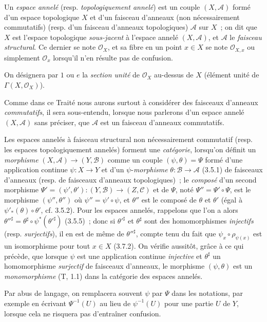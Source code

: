 \begin{env}[4.1.1]
\label{0.4.1.1-fr}
Un \emph{espace annelé} (resp. \emph{topologiquement annelé}) est un couple
$(X,\mathcal{A})$ formé d'un espace topologique $X$ et d'un faisceau d'anneaux
(non nécessairement commutatifs) (resp. d'un faisceau d'anneaux topologiques)
$\mathcal{A}$ sur $X$~; on dit que $X$ est l'espace
topologique \emph{sous-jacent} à l'espace annelé $(X,\mathcal{A})$, et
$\mathcal{A}$ le \emph{faisceau structural}. Ce dernier se note
$\mathcal{O}_X$, et sa fibre en un point $x\in X$ se note $\mathcal{O}_{X,x}$
ou simplement $\mathcal{O}_x$ lorsqu'il n'en résulte pas de confusion.

On désignera par $1$ ou $e$ la \emph{section unité} de $\mathcal{O}_X$
au-dessus de $X$ (élément unité de $\Gamma(X,\mathcal{O}_X)$).

Comme dans ce Traité nous aurons surtout à considérer des faisceaux d'anneaux
\emph{commutatifs}, il sera sous-entendu, lorsque nous parlerons d'un espace
annelé $(X,\mathcal{A})$ sans préciser, que $\mathcal{A}$ est un faisceau
d'anneaux commutatifs.

Les espaces annelés à faisceau structural non nécessairement commutatif
(resp. les espaces topologiquement annelés) forment une \emph{catégorie},
lorsqu'on définit un \emph{morphisme}
$(X,\mathcal{A})\to(Y,\mathcal{B})$ comme un couple
$(\psi,\theta)=\Psi$ formé d'une application continue $\psi:X\to Y$ et d'un
$\psi$-\emph{morphisme} $\theta:\mathcal{B}\to\mathcal{A}$ (3.5.1) de
faisceaux d'anneaux (resp. de faisceaux d'anneaux topologiques)~; le
\emph{composé} d'un second morphisme
$\Psi'=(\psi',\theta'):(Y,\mathcal{B})\to(Z,\mathcal{C})$ et de $\Psi$, noté
$\Psi''=\Psi'\circ\Psi$, est le morphisme $(\psi'',\theta'')$ où
$\psi''=\psi'\circ\psi$, et $\theta''$ est le composé de $\theta$ et $\theta'$
(égal à $\psi'_*(\theta)\circ\theta'$, cf. 3.5.2). Pour les espaces
annelés, rappelons que l'on a alors
$\theta''^\sharp=\theta^\sharp\circ\psi^*(\theta'^\sharp)$ (3.5.5)~; donc si
$\theta'^\sharp$ et $\theta^\sharp$ sont des homomorphismes \emph{injectifs}
(resp. \emph{surjectifs}), il en est de même de $\theta''^\sharp$, compte tenu
du fait que $\psi_x\circ\rho_{\psi(x)}$ est un isomorphisme pour tout $x\in X$
(3.7.2). On vérifie aussitôt, grâce à ce qui précède, que lorsque $\psi$
est une application continue \emph{injective} et $\theta^\sharp$ un
homomorphisme \emph{surjectif} de faisceaux d'anneaux, le morphisme
$(\psi,\theta)$ est un \emph{monomorphisme} (T, 1.1) dans la catégorie des
espaces annelés.

Par abus de langage, on remplacera souvent $\psi$ par $\Psi$ dans les
notations, par exemple en écrivant $\Psi^{-1}(U)$ au lieu de $\psi^{-1}(U)$
pour une partie $U$ de $Y$, lorsque cela ne risquera pas d'entraîner confusion.
\end{env}

